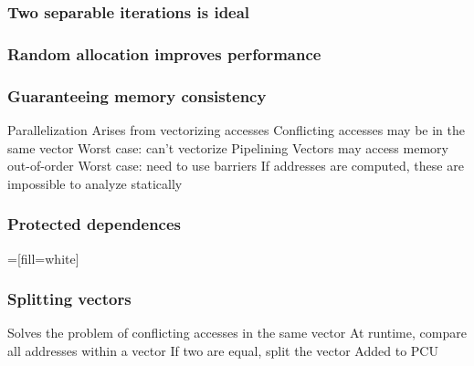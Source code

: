 \documentclass[aspectratio=169]{beamer}
\begin{document}
\begin{frame}
  \frametitle{Two separable iterations is ideal}
  \hskip1.5in
\end{frame}
\begin{frame}
  \frametitle{Random allocation improves performance}
  \hskip1.5in
\end{frame}
\begin{frame}
  \frametitle{Guaranteeing memory consistency}
  \begin{outline}
    \1 Parallelization
    \2 Arises from vectorizing accesses
    \2 Conflicting accesses may be in the same vector
    \2 Worst case: can't vectorize
    \pause
    \1 Pipelining
    \2 Vectors may access memory out-of-order
    \2 Worst case: need to use barriers
    \pause
    \1 If addresses are computed, these are impossible to analyze statically
  \end{outline}
\end{frame}
\begin{frame}
  \frametitle{Protected dependences}
  \newcommand{\rwsep}{5}
  \newcommand{\drawgrid}{
    \foreach \x in {0,1,2,3} {
      \draw[hairline] (-1,-\x) -- (14,-\x);
      \draw[hairline] (-1,-\rwsep-\x) -- (14,-\rwsep-\x);
    }
    \node[anchor=east] at (-2,-1.5) {Read};
    \node[anchor=east] at (-2,-\rwsep-1.5) {Write};
  }
  \newcommand{\drawstage}[2]{
        \foreach \i/\j in {#2} {
          \node[pipe_addr] (#1r\i\j) at (#1,-\i) {\j};
          \node[pipe_addr] (#1w\i\j) at (#1+4,-\rwsep-\i) {\j};
        }
      }
  =[fill=white]
\end{frame}
\fi
\begin{frame}
  \frametitle{Splitting vectors}
  \begin{outline}
    \1 Solves the problem of conflicting accesses in the same vector
    \1 At runtime, compare all addresses within a vector
    \1 If two are equal, split the vector
    \pause
    \1 Added to PCU
  \end{outline}
\end{frame}
\end{document}
